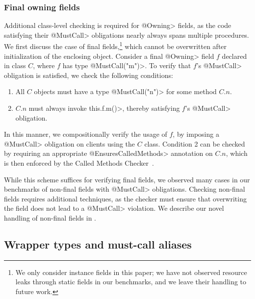 
\subsubsection{Final owning fields}
\label{sec:owning-fields}

  Additional class-level checking is required for \<@Owning> fields, as the code
  satisfying their \<@MustCall> obligations nearly always spans multiple
  procedures.  We first discuss the case of final fields,\footnote{We only
  consider instance fields in this paper; we have not observed resource leaks
  through static fields in our benchmarks, and we leave their handling to future
  work.} which cannot be overwritten after initialization of the enclosing
  object.  Consider a final \<@Owning> field $f$ declared in class $C$, where
  $f$ has type \<@MustCall("m")>.  To
  verify that $f$'s \<@MustCall> obligation is satisfied, we check the following
  conditions:
  \begin{enumerate}
    \item All $C$ objects must have a type \<@MustCall("n")> for some method $C.n$.
    \item $C.n$ must always invoke \<this.f.m()>, thereby satisfying $f$'s
    \<@MustCall> obligation.
  \end{enumerate}
  In this manner, we compositionally verify the usage of $f$, by imposing
  a \<@MustCall> obligation on clients using the $C$ class.  Condition 2 can be
  checked by requiring an appropriate \<@EnsuresCalledMethods> annotation on
  $C.n$, which is then enforced by the Called Methods
  Checker~\cite{kellogg20verifying}.  

  While this scheme suffices for verifying final fields, we observed many cases
  in our benchmarks of non-final fields with \<@MustCall> obligations.  Checking
  non-final fields requires additional techniques, as the checker must ensure
  that overwriting the field does not lead to a \<@MustCall> violation.  We
  describe our novel handling of non-final fields in .

\subsection{Wrapper types and must-call aliases}
\label{sec:must-call-choice}

